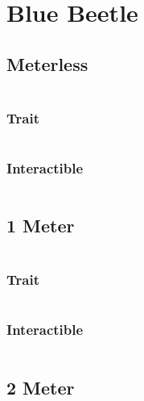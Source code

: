 \documentclass[main.tex]{subfiles}
\begin{document}
\chapter{Blue Beetle}

\section{Meterless}

\begin{lstlisting}[language=FG]
\end{lstlisting}

\subsection{Trait}

\begin{lstlisting}[language=FG]
\end{lstlisting}


\subsection{Interactible}
\begin{lstlisting}[language=FG]

\end{lstlisting}

\section{1 Meter}


\begin{lstlisting}[language=FG]
\end{lstlisting}

\subsection{Trait}

\begin{lstlisting}[language=FG]
\end{lstlisting}


\subsection{Interactible}
\begin{lstlisting}[language=FG]

\end{lstlisting}

\section{2 Meter}
\end{document}
